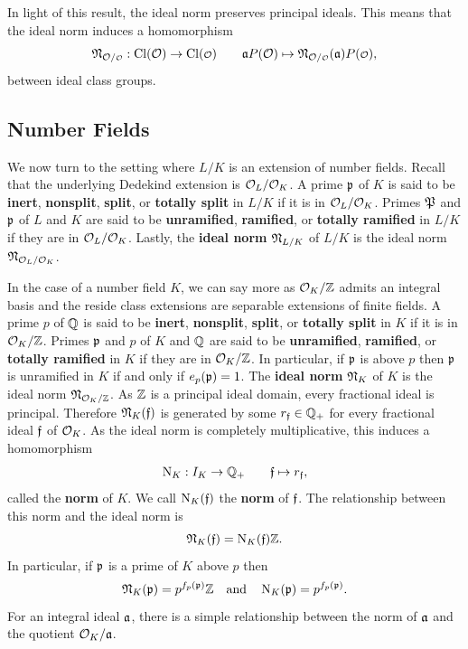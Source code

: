     In light of this result, the ideal norm preserves principal ideals. This means that the ideal norm induces a homomorphism
    \[
      \mf{N}_{\mc{O}/\smc{O}}:\Cl(\mc{O}) \to \Cl(\smc{O}) \qquad \mf{a}P(\mc{O}) \mapsto \mf{N}_{\mc{O}/\smc{O}}(\mf{a})P(\smc{O}),
    \]
    between ideal class groups.
    
    \subsection*{Number Fields}
      We now turn to the setting where \(L/K\) is an extension of number fields. Recall that the underlying Dedekind extension is \(\mathcal{O}_{L}/\mathcal{O}_{K}\). A prime \(\mathfrak{p}\) of \(K\) is said to be \textbf{inert}, \textbf{nonsplit}, \textbf{split}, or \textbf{totally split} in \(L/K\) if it is in \(\mathcal{O}_{L}/\mathcal{O}_{K}\). Primes \(\mathfrak{P}\) and \(\mathfrak{p}\) of \(L\) and \(K\) are said to be \textbf{unramified}, \textbf{ramified}, or \textbf{totally ramified} in \(L/K\) if they are in \(\mathcal{O}_{L}/\mathcal{O}_{K}\). Lastly, the \textbf{ideal norm} \(\mathfrak{N}_{L/K}\) of \(L/K\) is the ideal norm \(\mathfrak{N}_{\mathcal{O}_{L}/\mathcal{O}_{K}}\).

      In the case of a number field \(K\), we can say more as \(\mathcal{O}_{K}/\mathbb{Z}\) admits an integral basis and the reside class extensions are separable extensions of finite fields. A prime \(p\) of \(\mathbb{Q}\) is said to be \textbf{inert}, \textbf{nonsplit}, \textbf{split}, or \textbf{totally split} in \(K\) if it is in \(\mathcal{O}_{K}/\mathbb{Z}\). Primes \(\mathfrak{p}\) and \(p\) of \(K\) and \(\mathbb{Q}\) are said to be \textbf{unramified}, \textbf{ramified}, or \textbf{totally ramified} in \(K\) if they are in \(\mathcal{O}_{K}/\mathbb{Z}\). In particular, if \(\mathfrak{p}\) is above \(p\) then \(\mathfrak{p}\) is unramified in \(K\) if and only if \(e_{p}(\mathfrak{p}) = 1\). The \textbf{ideal norm} \(\mathfrak{N}_{K}\) of \(K\) is the ideal norm \(\mathfrak{N}_{\mathcal{O}_{K}/\mathbb{Z}}\). As \(\mathbb{Z}\) is a principal ideal domain, every fractional ideal is principal. Therefore \(\mathfrak{N}_{K}(\mathfrak{f})\) is generated by some \(r_{\mathfrak{f}} \in \mathbb{Q}_{+}\) for every fractional ideal \(\mathfrak{f}\) of \(\mathcal{O}_{K}\). As the ideal norm is completely multiplicative, this induces a homomorphism
      \[
        \operatorname{\mathrm{N}}_{K}:I_{K} \to \mathbb{Q}_{+} \qquad \mathfrak{f} \mapsto r_{\mathfrak{f}},
      \]
      called the \textbf{norm} of \(K\). We call \(\operatorname{\mathrm{N}}_{K}(\mathfrak{f})\) the \textbf{norm} of \(\mathfrak{f}\). The relationship between this norm and the ideal norm is
      \[
        \mathfrak{N}_{K}(\mathfrak{f}) = \operatorname{\mathrm{N}}_{K}(\mathfrak{f})\mathbb{Z}.
      \]
      In particular, if \(\mathfrak{p}\) is a prime of \(K\) above \(p\) then
      \[
        \mathfrak{N}_{K}(\mathfrak{p}) = p^{f_{p}(\mathfrak{p})}\mathbb{Z} \quad \text{and} \quad \operatorname{\mathrm{N}}_{K}(\mathfrak{p}) = p^{f_{p}(\mathfrak{p})}.
      \]
      For an integral ideal \(\mathfrak{a}\), there is a simple relationship between the norm of \(\mathfrak{a}\) and the quotient \(\mathcal{O}_{K}/\mathfrak{a}\).

